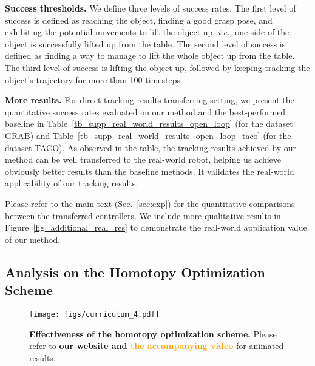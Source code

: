 \noindent\textbf{Success thresholds.} We define three levels of success rates. The first level of success is defined as reaching the object, finding a good grasp pose, and exhibiting the potential movements to lift the object up, \emph{i.e.,} one side of the object is successfully lifted up from the table. The second level of success is defined as finding a way to manage to lift the whole object up from the table. The third level of success is lifting the object up, followed by keeping tracking the object's trajectory for more than 100 timesteps. 

\noindent\textbf{More results.} For direct tracking results transferring setting, we present the quantitative success rates evaluated on our method and the best-performed baseline in Table~\ref{tb_supp_real_world_results_open_loop} (for the dataset GRAB) and Table~\ref{tb_supp_real_world_results_open_loop_taco} (for the dataset TACO). 
As observed in the table, the tracking results achieved by our method can be well transferred to the real-world robot, helping us achieve obviously better results than the baseline methods. It validates the real-world applicability of our tracking results. 

Please refer to the main text (Sec.~\ref{sec:exp}) for the quantitative comparisons between the transferred controllers. 
We include more qualitative results in Figure~\ref{fig_additional_real_res} to demonstrate the real-world application value of our method. 



\subsection{Analysis on the Homotopy Optimization Scheme} \label{sec:supp_exp_curriculum}


\begin{figure}[h]
  \centering
  \texttt{[image: figs/curriculum\_4.pdf]}
  \caption{
  \textbf{Effectiveness of the homotopy optimization scheme. }
  Please refer to \textbf{\href{https://projectwebsite7.github.io/gene-dex-manip/}{our website} and {\href{https://projectwebsite7.github.io/gene-dex-manip/static/videos-lowres/video_7.mp4}{\textcolor{orange}{the accompanying video}}}} for animated results.
  }
  \label{fig_curriculum}
\end{figure}

